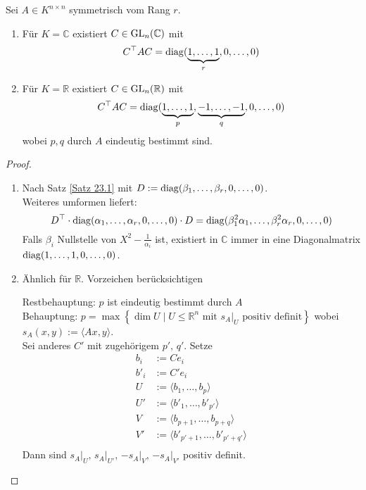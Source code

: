 \documentclass[parskip,a4paper,twoside,DIV15,BCOR12mm]{scrbook}
\begin{document}
\begin{theo}
\label{Satz 23.2}
Sei \(A\in K^{n\times n}\) symmetrisch vom Rang \(r\).
\begin{enumerate}
\item Für \(K=\mathbb{C}\) existiert \(C\in\operatorname{GL}_{n}(\mathbb{C})\) mit
\[
C^{\top}AC=\operatorname{diag}(\underbrace{1,\ldots,1}_{r},0,\ldots,0)
\]
\item Für \(K=\mathbb{R}\) existiert \(C\in\operatorname{GL}_{n}(\mathbb{R})\) mit
\[
C^{\top}AC=\operatorname{diag}(\underbrace{1,\ldots,1}_{p},\underbrace{-1,\ldots,-1}_{q},0,\ldots,0)
\]
wobei \(p,q\) durch \(A\) eindeutig bestimmt sind.
\end{enumerate}
\end{theo}
\begin{proof}
\begin{enumerate}
\item Nach Satz \ref{Satz 23.1} mit \(D:=\operatorname{diag}(\beta_{1},\ldots,\beta_{r},0,\ldots,0)\).\\
Weiteres umformen liefert:
\[
D^{\top}\cdot\operatorname{diag}(\alpha_{1},\ldots,\alpha_{r},0,\ldots,0)\cdot D=
\operatorname{diag}(\beta_{1}^{2}\alpha_{1},\ldots,\beta_{r}^{2}\alpha_{r},0,\ldots,0)
\]
Falls \(\beta_{i}\) Nullstelle von \(X^{2}-\frac{1}{\alpha_{i}}\) ist, existiert
in \(\mathbb{C}\) immer in eine Diagonalmatrix \(\operatorname{diag}(1,\ldots,1,0,\ldots,0)\).
\item \"Ahnlich für \(\mathbb{R}\). Vorzeichen berücksichtigen

Restbehauptung: \(p\) ist eindeutig bestimmt durch \(A\)\\
Behauptung: \(p=\max\left\{\dim U\mid U\leq\mathbb{R}^{n}\text{ mit } \left.
s_{A}\right|_{U}\text{ positiv definit}\right\}\) wobei 
\(s_{A}(x,y):=\langle Ax,y\rangle\).\\
Sei anderes \(C'\) mit zugehörigem \(p',\,q'\). Setze
\begin{align*}
b_{i}&:=Ce_{i}\\
b'_{i}&:=C'e_{i}\\
U&:=\langle b_{1},\ldots,b_{p}\rangle\\
U'&:=\langle b'_{1},\ldots,b'_{p'}\rangle\\
V&:=\langle b_{p+1},\ldots,b_{p+q}\rangle\\
V'&:=\langle b'_{p'+1},\ldots,b'_{p'+q'}\rangle\\
\end{align*}
Dann sind \(\left.s_{A}\right|_{U},\,\left.s_{A}\right|_{U'},\,\left.-s_{A}\right|_{V},\,\left.-s_{A}\right|_{V'}\) positiv definit.


\end{enumerate}
\end{proof}
\end{document}
